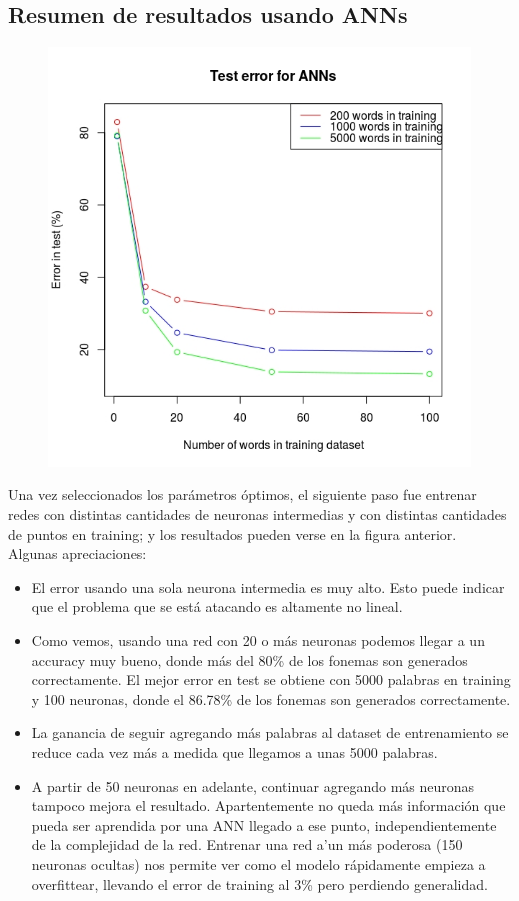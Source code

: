 \documentclass[paper=a4, fontsize=11pt]{scrartcl} %
\numberwithin{equation}{section} %
\numberwithin{figure}{section} %
\numberwithin{table}{section} %
\begin{document}
\subsection{Resumen de resultados usando ANNs}

\begin{figure}[h!]
\centering
\includegraphics[width=112mm]{annresults.jpg}
\end{figure}

Una vez seleccionados los parámetros óptimos, el siguiente paso fue entrenar redes con distintas cantidades de neuronas intermedias y con distintas cantidades de puntos en training; y los resultados pueden verse en la figura anterior. \\

Algunas apreciaciones:

\begin{itemize}
\item El error usando una sola neurona intermedia es muy alto. Esto puede indicar que el problema que se está atacando es altamente no lineal.
\item Como vemos, usando una red con 20 o más neuronas podemos llegar a un accuracy muy bueno, donde más del 80\% de los fonemas son generados correctamente. El mejor error en test se obtiene con 5000 palabras en training y 100 neuronas, donde el 86.78\% de los fonemas son generados correctamente.
\item La ganancia de seguir agregando más palabras al dataset de entrenamiento se reduce cada vez más a medida que llegamos a unas 5000 palabras. 
\item A partir de 50 neuronas en adelante, continuar agregando más neuronas tampoco mejora el resultado. Apartentemente no queda más información que pueda ser aprendida por una ANN llegado a ese punto, independientemente de la complejidad de la red. Entrenar una red a'un más poderosa (150 neuronas ocultas) nos permite ver como el modelo rápidamente empieza a overfittear, llevando el error de training al 3\% pero perdiendo generalidad.
\end{itemize}
\end{document}
